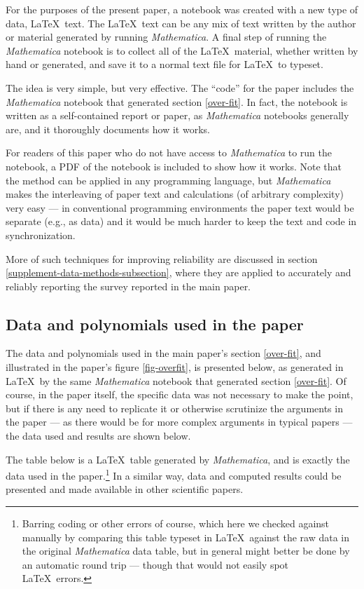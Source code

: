 \documentclass[10pt,a4paper]{article}
\begin{document}
For the purposes of the present paper, a notebook was created with a new type of data, \LaTeX\ text. The \LaTeX\ text can be any mix of text written by the author or material generated by running \emph{Mathematica}. A final step of running the \emph{Mathematica\/} notebook is to collect all of the \LaTeX\ material, whether written by hand or generated, and save it to a normal text file for \LaTeX\ to typeset. 

The idea is very simple, but very effective. The ``code'' for the paper includes the \emph{Mathematica\/} notebook that generated section \ref{over-fit}. In fact, the notebook is written as a self-contained report or paper, as \emph{Mathematica\/} notebooks generally are, and it thoroughly documents how it works. 

For readers of this paper who do not have access to \emph{Mathematica\/} to run the notebook, a PDF of the notebook is included to show how it works. Note that the method can be applied in any programming language, but \emph{Mathematica\/} makes the interleaving of paper text and calculations (of arbitrary complexity) very easy --- in conventional programming environments the paper text would be separate (e.g., as data) and it would be much harder to keep the text and code in synchronization.

More of such techniques for improving reliability are discussed in section \ref{supplement-data-methods-subsection}, where they are applied to accurately and reliably reporting the survey reported in the main paper.

\subsection{Data and polynomials used in the paper}
The data and polynomials used in the main paper's section \ref{over-fit}, and illustrated in the paper's figure \ref{fig-overfit}, is presented below, as generated in \LaTeX\ by the same \emph{Mathematica\/} notebook that generated section \ref{over-fit}. Of course, in the paper itself, the specific data was not necessary to make the point, but if there is any need to replicate it or otherwise scrutinize the arguments in the paper --- as there would be for more complex arguments in typical papers --- the data used and results are shown below. 

The table below is a \LaTeX\ table generated by \emph{Mathematica}, and is exactly the data used in the paper.\footnote{Barring coding or other errors of course, which here we checked against manually by comparing this table typeset in \LaTeX\ against the raw data in the original \emph{Mathematica\/} data table, but in general might better be done by an automatic round trip --- though that would not easily spot \LaTeX\ errors.} In a similar way, data and computed results could be presented and made available in other scientific papers.
\end{document}
